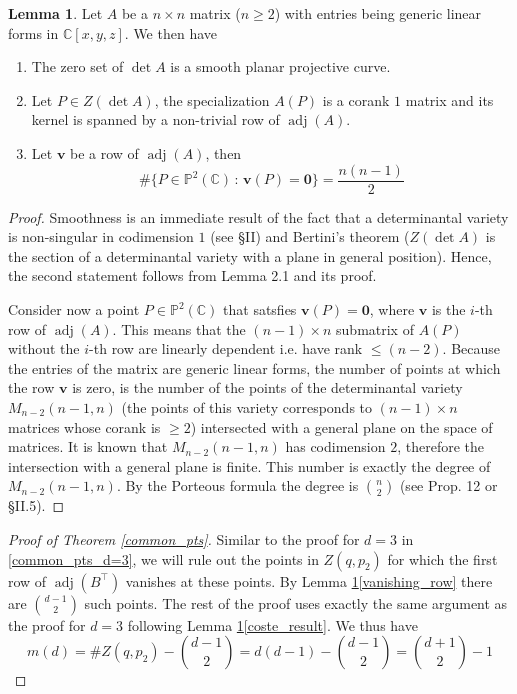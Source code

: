 \documentclass[a4paper,11pt]{amsart}%
\newcommand\sep{\,:\,}
\renewcommand\C{\mathbb{C}} %
\newcommand\C{\mathbb{C}}
\newcommand\adj{\operatorname{adj}}
\renewcommand\P{\mathbb{P}}
\theoremstyle{definition}
\newtheorem{lemma}[theorem]{Lemma}
\begin{document}
\begin{lemma}\label{generic_mat}
Let $A$ be a $n\times n$ matrix ($n\ge 2$) with entries being generic linear forms in $\C[x,y,z]$. We then have 
\begin{enumerate}[label=\alph*.)]
\item The zero set of $\det A$ is a smooth planar projective curve.
\item \label{coste_result} Let $P\in Z(\det A)$, the specialization $A(P)$  is a corank $1$ matrix and its kernel is spanned by a non-trivial row of $\adj(A)$.
\item \label{vanishing_row} Let $\bm v$ be a row of $\adj(A)$, then 
$$\#\{P\in \P^2(\C) \sep \bm v(P) = \bm 0\} = \frac {n(n-1)}2$$
\end{enumerate}
\end{lemma}
\begin{proof}
Smoothness is an immediate result of the fact that a determinantal 
variety is non-singular in codimension $1$ (see \cite{arbarello} \S II) and Bertini's theorem ($Z(\det A)$ is the section of a determinantal 
variety with a plane in general position). Hence, the second statement follows from \cite{coste} Lemma 2.1 and its proof.

Consider now a point $P\in \P^2(\C)$ that satsfies $\bm v(P)=\bm 0$, where $\bm v$ is the $i$-th row of 
$\adj(A)$. This means that the $(n-1)\times n$ submatrix of $A(P)$ without the $i$-th row are linearly dependent i.e. have rank $\le (n-2)$. 
Because the entries of the matrix are generic linear forms, the number 
of points at which the row $\bm v$ is zero, is the number of the points of the determinantal variety $M_{n-2}(n-1,n)$ (the points of this variety 
corresponds to $(n-1)\times n$ matrices whose corank is 
$\ge 2$) intersected with a general plane on the space of matrices. It is known that $M_{n-2}(n-1,n)$ has codimension $2$, therefore the 
intersection with a general plane is finite. This number is exactly the degree of $M_{n-2}(n-1,n)$. By the Porteous formula the degree is $\binom n2$ (see \cite{harris} Prop. 12 
or \cite{arbarello} \S II.5).
\end{proof}

\begin{proof}[Proof of Theorem \ref{common_pts}]
Similar to the proof for $d=3$ in \ref{common_pts_d=3}, we will rule out the points in $Z(q,p_2)$ for which the first row of $\adj(B^\top)$ vanishes at these points. 
By Lemma \ref{generic_mat}\ref{vanishing_row} there are $\binom {d-1}2$ such points. The rest of the proof uses exactly the same argument as the proof for $d=3$ following Lemma 
\ref{generic_mat}\ref{coste_result}. We thus have 
$$ m(d) =\# Z(q,p_2) - \binom {d-1}2 = d(d-1) - \binom {d-1}2 = \binom{d+1}2  - 1$$
\end{proof}






\end{document}
